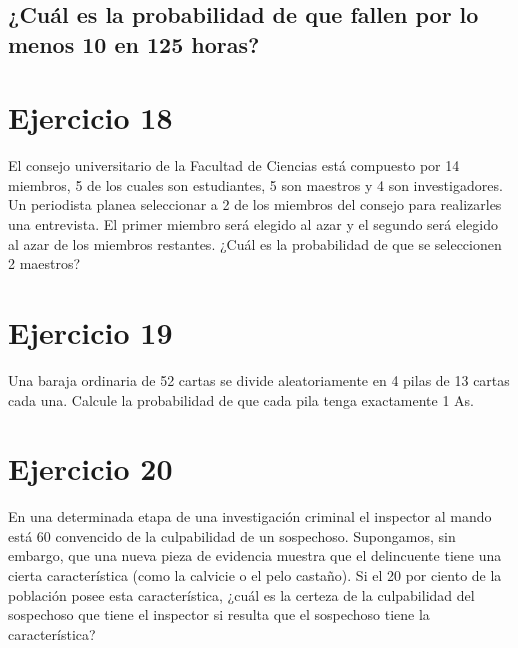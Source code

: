 \documentclass[12pt]{article}
\begin{document}
\subsection{¿Cuál es la probabilidad de que fallen por lo menos 10 en 125 horas?}
\section{Ejercicio 18}
 El consejo universitario de la Facultad de Ciencias está compuesto por 14 miembros, 5 de los
cuales son estudiantes, 5 son maestros y 4 son investigadores. Un periodista planea seleccionar
a 2 de los miembros del consejo para realizarles una entrevista. El primer miembro será elegido
al azar y el segundo será elegido al azar de los miembros restantes. ¿Cuál es la probabilidad
de que se seleccionen 2 maestros?
\section{Ejercicio 19}
Una baraja ordinaria de 52 cartas se divide aleatoriamente en 4 pilas de 13 cartas cada una.
Calcule la probabilidad de que cada pila tenga exactamente 1 As.
\section{Ejercicio 20}
 En una determinada etapa de una investigación criminal el inspector al mando está 60 %
convencido de la culpabilidad de un sospechoso. Supongamos, sin embargo, que una nueva
pieza de evidencia muestra que el delincuente tiene una cierta característica (como la calvicie
o el pelo castaño). Si el 20 por ciento de la población posee esta característica, ¿cuál es la
certeza de la culpabilidad del sospechoso que tiene el inspector si resulta que el sospechoso
tiene la característica?
\end{document}

